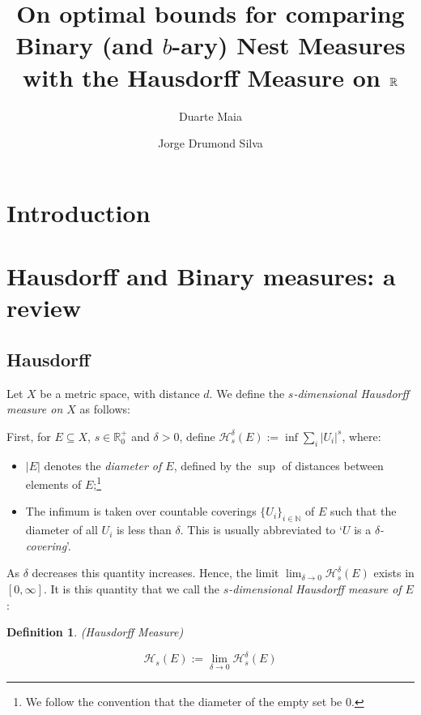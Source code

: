 \documentclass[11pt]{amsart}
\title[\textbf{Optimal bounds for $b$-ary measures}]{\textbf{On optimal bounds for comparing Binary (and $b$-ary) Nest Measures with the Hausdorff Measure on $\R$}}
\author{Duarte Maia}
\author{Jorge Drumond Silva}
\date{}
\newcommand{\R}{\mathbb{R}}
\newcommand{\N}{\mathbb{N}}
\newcommand{\HH}{\mathcal{H}}
\newtheorem{definition}{Definition}
\begin{document}
\begin{abstract}
\lipsum[1]
\end{abstract}

\maketitle


\section{Introduction}

\lipsum[1]

\section{Hausdorff and Binary measures: a review}

\subsection{Hausdorff}

Let $X$ be a metric space, with distance $d$. We define the \emph{$s$-dimensional Hausdorff measure on $X$} as follows:

First, for $E \subseteq X$, $s \in \R^+_0$ and $\delta > 0$, define $\HH_s^\delta(E) := \inf \sum_i \lvert U_i \rvert^s$, where:

\begin{itemize}

\item $\lvert E \rvert$ denotes the \emph{diameter of $E$}, defined by the $\sup$ of distances between elements of $E$;\footnote{We follow the convention that the diameter of the empty set be 0.}

\item The infimum is taken over countable coverings $\{U_i\}_{i \in \N}$ of $E$ such that the diameter of all $U_i$ is less than $\delta$. This is usually abbreviated to `$U$ is a \emph{$\delta$-covering}'.

\end{itemize}

As $\delta$ decreases this quantity increases. Hence, the limit $\lim_{\delta \to 0} \HH_s^\delta(E)$ exists in $\left[ 0, \infty \right]$. It is this quantity that we call the \emph{$s$-dimensional Hausdorff measure of $E$}:

\begin{definition}(Hausdorff Measure)

 \[\HH_s(E) := \lim_{\delta \to 0} \HH_s^\delta(E)\]
\end{definition}
\end{document}
